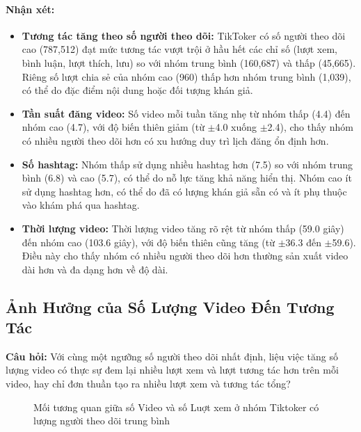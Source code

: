 \paragraph{Nhận xét:}
\begin{itemize}
    \item \textbf{Tương tác tăng theo số người theo dõi:} TikToker có số người theo dõi cao (787,512) đạt mức tương tác vượt trội ở hầu hết các chỉ số (lượt xem, bình luận, lượt thích, lưu) so với nhóm trung bình (160,687) và thấp (45,665). Riêng số lượt chia sẻ của nhóm cao (960) thấp hơn nhóm trung bình (1,039), có thể do đặc điểm nội dung hoặc đối tượng khán giả.
    
    \item \textbf{Tần suất đăng video:} Số video mỗi tuần tăng nhẹ từ nhóm thấp (4.4) đến nhóm cao (4.7), với độ biến thiên giảm (từ $\pm$4.0 xuống $\pm$2.4), cho thấy nhóm có nhiều người theo dõi hơn có xu hướng duy trì lịch đăng ổn định hơn.
    
    \item \textbf{Số hashtag:} Nhóm thấp sử dụng nhiều hashtag hơn (7.5) so với nhóm trung bình (6.8) và cao (5.7), có thể do nỗ lực tăng khả năng hiển thị. Nhóm cao ít sử dụng hashtag hơn, có thể do đã có lượng khán giả sẵn có và ít phụ thuộc vào khám phá qua hashtag.
    
    \item \textbf{Thời lượng video:} Thời lượng video tăng rõ rệt từ nhóm thấp (59.0 giây) đến nhóm cao (103.6 giây), với độ biến thiên cũng tăng (từ $\pm$36.3 đến $\pm$59.6). Điều này cho thấy nhóm có nhiều người theo dõi hơn thường sản xuất video dài hơn và đa dạng hơn về độ dài.
\end{itemize}


\subsection{Ảnh Hưởng của Số Lượng Video Đến Tương Tác}
\textbf{Câu hỏi:} Với cùng một ngưỡng số người theo dõi nhất định, liệu việc tăng số lượng video có thực sự đem lại nhiều lượt xem và lượt tương tác hơn trên mỗi video, hay chỉ đơn thuần tạo ra nhiều lượt xem và tương tác tổng?

\begin{figure}[H]
    \centering
    \caption{Mối tương quan giữa số Video và số Luợt xem ở nhóm Tiktoker có lượng người theo dõi trung bình}
    \label{fig:so_video_luot_xem_nhom_TB}
\end{figure}

